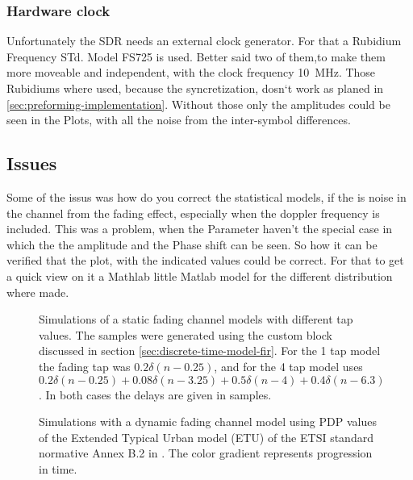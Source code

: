 \subsubsection{Hardware clock}
Unfortunately the SDR needs an external clock generator. For that a Rubidium Frequency STd. Model FS725 is used. Better said two of them,to make them more moveable and independent, with the clock frequency \SI{10}{\mega\hertz}. Those Rubidiums where used, because the syncretization, dosn`t work as planed in \ref{sec:preforming-implementation}. 
Without those only the amplitudes could be seen in the Plots, with all the noise from the inter-symbol differences. 

\subsection{Issues}
Some of the issus was how do you correct the statistical models, if the is noise in the channel from the fading effect, especially when the doppler frequency is included. This was a problem, when the Parameter haven't the special case in which the the amplitude and the Phase shift can be seen. So how it can be verified that the plot, with the indicated values could be correct. 
For that to get a quick view on it a  Mathlab little Matlab model for the different distribution where made.


\begin{figure}
	\centering
	
	\caption{
		Simulations of a static fading channel models with different tap values. The samples were generated using the custom block discussed in section \ref{sec:discrete-time-model-fir}. For the 1 tap model the fading tap was \(0.2\delta(n - 0.25)\), and for the 4 tap model uses \(0.2 \delta(n - 0.25) + 0.08 \delta(n - 3.25) + 0.5 \delta(n - 4) + 0.4 \delta(n - 6.3)\). In both cases the delays are given in samples.
	}
\end{figure}
\newpage
\begin{figure}
	\centering
	
	\caption{
		Simulations with a dynamic fading channel model using PDP values of the Extended Typical Urban model (ETU) of the ETSI standard normative Annex B.2 in \cite{ETSI}. The color gradient represents progression in time.
	}
\end{figure}
\restoregeometry
